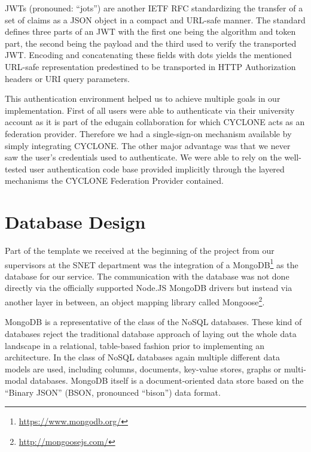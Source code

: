 JWTs (pronouned: \enquote{jots}) are another IETF RFC \cite{bradley2015json} standardizing the transfer of a set of claims as a JSON object in a compact and URL-safe manner. The standard defines three parts of an JWT with the first one being the algorithm and token part, the second being the payload and the third used to verify the transported JWT. Encoding and concatenating these fields with dots yields the mentioned URL-safe representation predestined to be transported in HTTP Authorization headers or URI query parameters.

This authentication environment helped us to achieve multiple goals in our implementation. First of all users were able to authenticate via their university account as it is part of the edugain collaboration for which CYCLONE acts as an federation provider. Therefore we had a single-sign-on mechanism available by simply integrating CYCLONE. The other major advantage was that we never saw the user's credentials used to authenticate. We were able to rely on the well-tested user authentication code base provided implicitly through the layered mechanisms the CYCLONE Federation Provider contained.


\vspace{0.5cm}

\section{Database Design}

Part of the template we received at the beginning of the project from our supervisors at the SNET department was the integration of a MongoDB\footnote{\url{https://www.mongodb.org/}} as the database for our service. The communication with the database was not done directly via the officially supported Node.JS MongoDB drivers but instead via another layer in between, an object mapping library called Mongoose\footnote{\url{http://mongoosejs.com/}}.

MongoDB is a representative of the class of the NoSQL databases. These kind of databases reject the traditional database approach of laying out the whole data landscape in a relational, table-based fashion prior to implementing an architecture. In the class of NoSQL databases again multiple different data models are used, including columns, documents, key-value stores, graphs or multi-modal databases. MongoDB itself is a document-oriented data store based on the \enquote{Binary JSON} (BSON, pronounced \enquote{bison}) data format.

